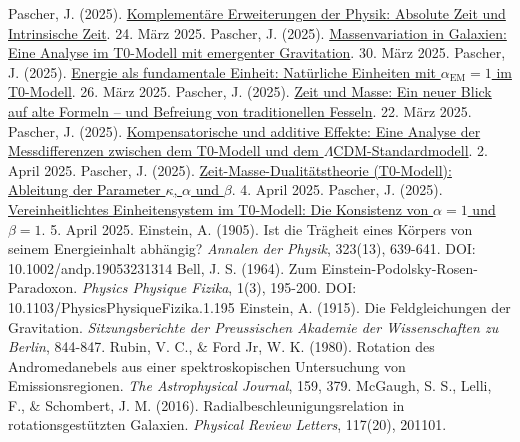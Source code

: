 \documentclass[12pt,a4paper]{article}
\newcommand{\alphaEM}{\alpha_{\text{EM}}}
\begin{document}
	\begin{thebibliography}{99}
		 Pascher, J. (2025). \href{https://github.com/jpascher/T0-Time-Mass-Duality/tree/main/2/pdf/Deutsch/KomplementPhysikZeit.pdf}{Komplementäre Erweiterungen der Physik: Absolute Zeit und Intrinsische Zeit}. 24. März 2025.
		 Pascher, J. (2025). \href{https://github.com/jpascher/T0-Time-Mass-Duality/tree/main/2/pdf/Deutsch/MassVarGalaxien.pdf}{Massenvariation in Galaxien: Eine Analyse im T0-Modell mit emergenter Gravitation}. 30. März 2025.
		 Pascher, J. (2025). \href{https://github.com/jpascher/T0-Time-Mass-Duality/tree/main/2/pdf/Deutsch/NatEinheitenAlpha1.pdf}{Energie als fundamentale Einheit: Natürliche Einheiten mit \(\alphaEM = 1\) im T0-Modell}. 26. März 2025.
		 Pascher, J. (2025). \href{https://github.com/jpascher/T0-Time-Mass-Duality/tree/main/2/pdf/Deutsch/ZeitMasseNeuerBlick.pdf}{Zeit und Masse: Ein neuer Blick auf alte Formeln – und Befreiung von traditionellen Fesseln}. 22. März 2025.
		 Pascher, J. (2025). \href{https://github.com/jpascher/T0-Time-Mass-Duality/tree/main/2/pdf/Deutsch/MessdifferenzenT0Standard.pdf}{Kompensatorische und additive Effekte: Eine Analyse der Messdifferenzen zwischen dem T0-Modell und dem \(\Lambda\)CDM-Standardmodell}. 2. April 2025.
		 Pascher, J. (2025). \href{https://github.com/jpascher/T0-Time-Mass-Duality/tree/main/2/pdf/Deutsch/ZeitMasseT0Params.pdf}{Zeit-Masse-Dualitätstheorie (T0-Modell): Ableitung der Parameter \(\kappa\), \(\alpha\) und \(\beta\)}. 4. April 2025.
		 Pascher, J. (2025). \href{https://github.com/jpascher/T0-Time-Mass-Duality/tree/main/2/pdf/Deutsch/Alpha1Beta1Konsistenz.pdf}{Vereinheitlichtes Einheitensystem im T0-Modell: Die Konsistenz von \(\alpha = 1\) und \(\beta = 1\)}. 5. April 2025.
		 Einstein, A. (1905). Ist die Trägheit eines Körpers von seinem Energieinhalt abhängig? \textit{Annalen der Physik}, 323(13), 639-641. DOI: 10.1002/andp.19053231314
		 Bell, J. S. (1964). Zum Einstein-Podolsky-Rosen-Paradoxon. \textit{Physics Physique Fizika}, 1(3), 195-200. DOI: 10.1103/PhysicsPhysiqueFizika.1.195
		 Einstein, A. (1915). Die Feldgleichungen der Gravitation. \textit{Sitzungsberichte der Preussischen Akademie der Wissenschaften zu Berlin}, 844-847.
		 Rubin, V. C., \& Ford Jr, W. K. (1980). Rotation des Andromedanebels aus einer spektroskopischen Untersuchung von Emissionsregionen. \textit{The Astrophysical Journal}, 159, 379.
		 McGaugh, S. S., Lelli, F., \& Schombert, J. M. (2016). Radialbeschleunigungsrelation in rotationsgestützten Galaxien. \textit{Physical Review Letters}, 117(20), 201101.
	\end{thebibliography}
	
\end{document}
